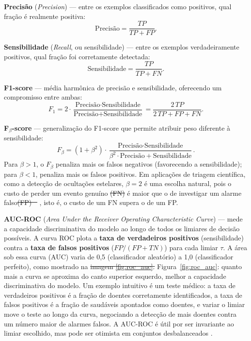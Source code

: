 \documentclass[msc]{on} %
\makeatletter
\providecommand{\DIFaddtex}[1]{{\protect\color{red}#1}} %
\providecommand{\DIFdeltex}[1]{{\protect\color{red}\sout{#1}}} %
\providecommand{\DIFaddbegin}{} %
\providecommand{\DIFaddend}{} %
\providecommand{\DIFdelbegin}{} %
\providecommand{\DIFdelend}{} %
\providecommand{\DIFadd}[1]{\texorpdfstring{\DIFaddtex{#1}}{#1}} %
\providecommand{\DIFdel}[1]{\texorpdfstring{\DIFdeltex{#1}}{}} %
\let\sout@orig\sout %
\renewcommand{\sout}[1]{\ifmmode\text{\sout@orig{\ensuremath{#1}}}\else\sout@orig{#1}\fi} %
\makeatother
\begin{document}
\textbf{Precisão} (\textit{Precision}) --- entre os exemplos classificados como positivos, qual fração é realmente positiva:
\begin{equation}
\text{Precisão} = \frac{TP}{TP + FP}.
\end{equation}

\textbf{Sensibilidade} (\textit{Recall}, ou sensibilidade) --- entre os exemplos verdadeiramente positivos, qual fração foi corretamente detectada:
\begin{equation}
\text{Sensibilidade} = \frac{TP}{TP + FN}.
\end{equation}

\textbf{F1-score} --- média harmônica de precisão e sensibilidade, oferecendo um compromisso entre ambas:
\begin{equation}
F_1 = 2 \cdot \frac{\text{Precisão} \cdot \text{Sensibilidade}}{\text{Precisão} + \text{Sensibilidade}} = \frac{2\,TP}{2\,TP + FP + FN}.
\end{equation}

\textbf{F$_\beta$-score} --- generalização do F1-score que permite atribuir peso diferente à sensibilidade:
\begin{equation}
F_\beta = (1 + \beta^2) \cdot \frac{\text{Precisão} \cdot \text{Sensibilidade}}{\beta^2 \cdot \text{Precisão} + \text{Sensibilidade}}.
\end{equation}
Para $\beta > 1$, o $F_\beta$ penaliza mais os falsos negativos (favorecendo a sensibilidade); para $\beta < 1$, penaliza mais os falsos positivos. Em aplicações de triagem científica, como a detecção de ocultações estelares, $\beta = 2$ é uma escolha natural, pois o custo de perder um evento genuíno \DIFdelbegin \DIFdel{(FN) }\DIFdelend é maior que o de investigar um alarme falso\DIFdelbegin \DIFdel{(FP) \mbox{%
\citep{Saito2015}}\hskip0pt%
}\DIFdelend \DIFaddbegin \DIFadd{, isto é, o custo de um FN supera o de um FP}\DIFaddend .

\textbf{AUC-ROC} (\textit{Area Under the Receiver Operating Characteristic Curve}) --- mede a capacidade discriminativa do modelo ao longo de todos os limiares de decisão possíveis. A curva ROC plota a \textbf{taxa de verdadeiros positivos} (sensibilidade) contra a \textbf{taxa de falsos positivos} ($FP/(FP+TN)$) para cada limiar $\tau$. A área sob essa curva (AUC) varia de 0,5 (classificador aleatório) a 1,0 (classificador perfeito), como mostrado na \DIFdelbegin \DIFdel{imagem \ref{fig:roc_auc}. }\DIFdelend \DIFaddbegin \DIFadd{Figura~\ref{fig:roc_auc}: quanto mais a curva se aproxima do canto superior esquerdo, melhor a capacidade discriminativa do modelo. Um exemplo intuitivo é um teste médico: a taxa de verdadeiros positivos é a fração de doentes corretamente identificados, a taxa de falsos positivos é a fração de saudáveis apontados como doentes, e variar o limiar move o teste ao longo da curva, negociando a detecção de mais doentes contra um número maior de alarmes falsos. }\DIFaddend A AUC-ROC é útil por ser invariante ao limiar escolhido, mas pode ser otimista em conjuntos desbalanceados \citep{Saito2015}.
\end{document}
